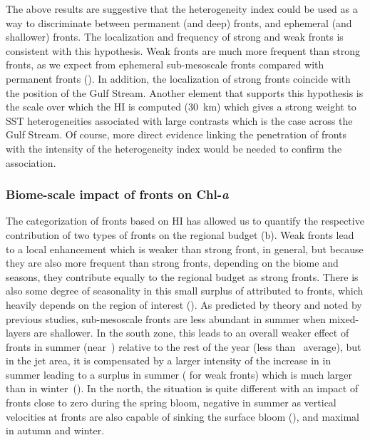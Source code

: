 The above results are suggestive that the heterogeneity index could be used as a way to discriminate between permanent (and deep) fronts, and ephemeral (and shallower) fronts.
The localization and frequency of strong and weak fronts is consistent with this hypothesis.
Weak fronts are much more frequent than strong fronts, as we expect from ephemeral sub-mesoscale fronts compared with permanent fronts ().
In addition, the localization of strong fronts coincide with the position of the Gulf Stream.
Another element that supports this hypothesis is the scale over which the HI is computed (\qty{30}{\km}) which gives a strong weight to SST heterogeneities associated with large contrasts which is the case across the Gulf Stream.
Of course, more direct evidence linking the penetration of fronts with the intensity of the heterogeneity index would be needed to confirm the association.

\subsubsection{Biome-scale impact of fronts on Chl-\textit{a}}

The categorization of fronts based on HI has allowed us to quantify the respective contribution of two types of fronts on the regional  budget (b).
Weak fronts lead to a local  enhancement which is weaker than strong front, in general, but because they are also more frequent than strong fronts, depending on the biome and seasons, they contribute equally to the regional  budget as strong fronts.
There is also some degree of seasonality in this small surplus of  attributed to fronts, which heavily depends on the region of interest ().
As predicted by theory and noted by previous studies, sub-mesoscale fronts  are less abundant in summer when mixed-layers are shallower.
In the south zone, this leads to an overall weaker effect of fronts in summer (near~) relative to the rest of the year (less than~ average), but in the jet area, it is compensated by a larger intensity of the increase in  in summer leading to a  surplus in summer ( for weak fronts) which is much larger than in winter~().
In the north, the situation is quite different with an impact of fronts close to zero during the spring bloom, negative in summer as vertical velocities at fronts are also capable of sinking the surface bloom (\cite{levy_2018}), and maximal in autumn and winter.

